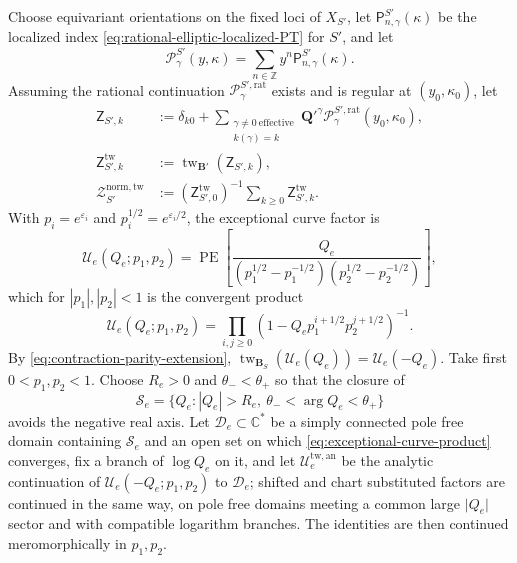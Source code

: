 \documentclass{amsart}
\theoremstyle{definition}
\numberwithin{equation}{section}
\newcommand{\C}{\mathbb C}
\newcommand{\Z}{\mathbb Z}
\newcommand{\PE}{\operatorname{PE}}
\newcommand{\eps}{\varepsilon}
\begin{document}
Choose equivariant orientations on the fixed loci of \(X_{S'}\), let \(\mathsf P^{S'}_{n,\gamma}(\kappa)\) be the localized index \eqref{eq:rational-elliptic-localized-PT} for \(S'\), and let
\[
 \mathcal P^{S'}_\gamma(y,\kappa)
 =\sum_{n\in\Z}y^n\mathsf P^{S'}_{n,\gamma}(\kappa).
\]
Assuming the rational continuation \(\mathcal P_{\gamma}^{S',\mathrm{rat}}\) exists and is regular at \((y_0,\kappa_0)\), let
\begin{equation}
\begin{aligned}
 \mathsf Z_{S',k}
 &:={\delta}_{k0}+
 \sum_{\substack{\gamma\ne0\ \mathrm{effective}\\ k(\gamma)=k}}
 \mathbf Q'^\gamma
 \mathcal P_{\gamma}^{S',\mathrm{rat}}(y_0,\kappa_0),\\
 \mathsf Z_{S',k}^{\mathrm{tw}}
 &:=\operatorname{tw}_{\mathbf B'}(\mathsf Z_{S',k}),\\
 \mathcal Z_{S'}^{\mathrm{norm,tw}}
 &:=(\mathsf Z_{S',0}^{\mathrm{tw}})^{-1}
   \sum_{k\geq0}\mathsf Z_{S',k}^{\mathrm{tw}}.
\end{aligned}
\label{eq:contracted-surface-series-definition}
\end{equation}
With \(p_i=e^{\eps_i}\) and \(p_i^{1/2}=e^{\eps_i/2}\), the exceptional curve factor is
\begin{equation}
 \mathcal U_e(Q_e;p_1,p_2)
 =\PE\left[
 \frac{Q_e}
 {(p_1^{1/2}-p_1^{-1/2})(p_2^{1/2}-p_2^{-1/2})}
 \right],
\label{eq:exceptional-curve-factor}
\end{equation}
which for \(|p_1|,|p_2|<1\) is the convergent product
\begin{equation}
 \mathcal U_e(Q_e;p_1,p_2)
 =\prod_{i,j\geq0}
  \left(1-Q_ep_1^{i+1/2}p_2^{j+1/2}\right)^{-1}.
 \label{eq:exceptional-curve-product}
\end{equation}
By \eqref{eq:contraction-parity-extension}, \(\operatorname{tw}_{\mathbf B_S}(\mathcal U_e(Q_e))= \mathcal U_e(-Q_e)\).  Take first \(0<p_1,p_2<1\).  Choose \(R_e>0\) and \(\theta_-<\theta_+\) so that the closure of
\[
 \mathscr S_e=\{Q_e:|Q_e|>R_e,\ \theta_-<\arg Q_e<\theta_+\}
\]
avoids the negative real axis.  Let \(\mathscr D_e\subset\C^*\) be a simply connected pole free domain containing \(\mathscr S_e\) and an open set on which \eqref{eq:exceptional-curve-product} converges, fix a branch of \(\log Q_e\) on it, and let \(\mathcal U_e^{\mathrm{tw,an}}\) be the analytic continuation of \(\mathcal U_e(-Q_e;p_1,p_2)\) to \(\mathscr D_e\); shifted and chart substituted factors are continued in the same way, on pole free domains meeting a common large \(\lvert Q_e\rvert\) sector and with compatible logarithm branches.  The identities are then continued meromorphically in \(p_1,p_2\).
\end{document}
